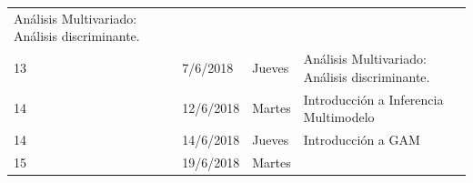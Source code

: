 \documentclass[]{book}
\theoremstyle{definition}
\theoremstyle{definition}
\theoremstyle{definition}
\theoremstyle{remark}
\begin{document}
\begin{longtable}[]{@{}llll@{}}
\begin{minipage}[t]{0.71\columnwidth}
Análisis Multivariado: Análisis discriminante.\strut
\end{minipage}\tabularnewline
\begin{minipage}[t]{0.05\columnwidth}\raggedright
13\strut
\end{minipage} & \begin{minipage}[t]{0.07\columnwidth}\raggedright
7/6/2018\strut
\end{minipage} & \begin{minipage}[t]{0.05\columnwidth}\raggedright
Jueves\strut
\end{minipage} & \begin{minipage}[t]{0.71\columnwidth}\raggedright
Análisis Multivariado: Análisis discriminante.\strut
\end{minipage}\tabularnewline
\begin{minipage}[t]{0.05\columnwidth}\raggedright
14\strut
\end{minipage} & \begin{minipage}[t]{0.07\columnwidth}\raggedright
12/6/2018\strut
\end{minipage} & \begin{minipage}[t]{0.05\columnwidth}\raggedright
Martes\strut
\end{minipage} & \begin{minipage}[t]{0.71\columnwidth}\raggedright
Introducción a Inferencia Multimodelo\strut
\end{minipage}\tabularnewline
\begin{minipage}[t]{0.05\columnwidth}\raggedright
14\strut
\end{minipage} & \begin{minipage}[t]{0.07\columnwidth}\raggedright
14/6/2018\strut
\end{minipage} & \begin{minipage}[t]{0.05\columnwidth}\raggedright
Jueves\strut
\end{minipage} & \begin{minipage}[t]{0.71\columnwidth}\raggedright
Introducción a GAM\strut
\end{minipage}\tabularnewline
\begin{minipage}[t]{0.05\columnwidth}\raggedright
15\strut
\end{minipage} & \begin{minipage}[t]{0.07\columnwidth}\raggedright
19/6/2018\strut
\end{minipage} & \begin{minipage}[t]{0.05\columnwidth}\raggedright
Martes\strut
\end{minipage} & \begin{minipage}[t]{0.71\columnwidth}\raggedright

\end{minipage}
\end{longtable}
\end{document}
